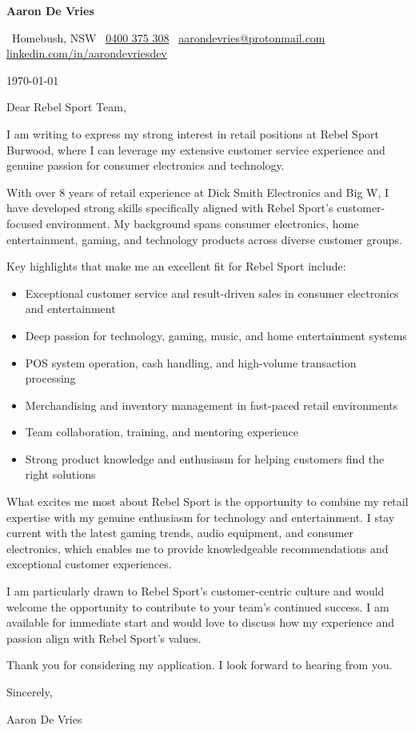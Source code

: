 \documentclass[a4paper,10pt]{article}
\makeatletter
\providecommand{\ContactBlock}{}
\renewcommand{\ContactBlock}{%
  {\Large \textbf{Aaron De Vries}}\par
  {\color{MidBlue}\small
  \faIcon{map-marker-alt}\, Homebush, NSW \quad\textbar\quad
  \faIcon{phone}\, \href{tel:+61400375308}{0400 375 308} \quad\textbar\quad
  \faIcon{envelope}\, \href{mailto:aarondevries@protonmail.com}{aarondevries@protonmail.com} \quad\textbar\quad
  \faIcon[brands]{linkedin}\, \href{https://linkedin.com/in/aarondevriesdev}{linkedin.com/in/aarondevriesdev}%
  }\par
}
\makeatother
\begin{document}
\ContactBlock

\vspace{1em}

\today

\vspace{1em}

Dear Rebel Sport Team,

I am writing to express my strong interest in retail positions at Rebel Sport Burwood, where I can leverage my extensive customer service experience and genuine passion for consumer electronics and technology.

With over 8 years of retail experience at Dick Smith Electronics and Big W, I have developed strong skills specifically aligned with Rebel Sport's customer-focused environment. My background spans consumer electronics, home entertainment, gaming, and technology products across diverse customer groups.

Key highlights that make me an excellent fit for Rebel Sport include:
\begin{itemize}
\item Exceptional customer service and result-driven sales in consumer electronics and entertainment
\item Deep passion for technology, gaming, music, and home entertainment systems
\item POS system operation, cash handling, and high-volume transaction processing
\item Merchandising and inventory management in fast-paced retail environments
\item Team collaboration, training, and mentoring experience
\item Strong product knowledge and enthusiasm for helping customers find the right solutions
\end{itemize}

What excites me most about Rebel Sport is the opportunity to combine my retail expertise with my genuine enthusiasm for technology and entertainment. I stay current with the latest gaming trends, audio equipment, and consumer electronics, which enables me to provide knowledgeable recommendations and exceptional customer experiences.

I am particularly drawn to Rebel Sport's customer-centric culture and would welcome the opportunity to contribute to your team's continued success. I am available for immediate start and would love to discuss how my experience and passion align with Rebel Sport's values.

Thank you for considering my application. I look forward to hearing from you.

Sincerely,

Aaron De Vries
\end{document}

